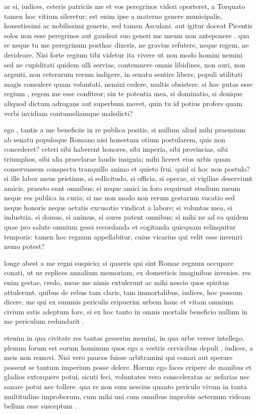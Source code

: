  ac si, iudices, ceteris patriciis me et vos peregrinos videri oporteret, a Torquato tamen hoc vitium sileretur; est enim ipse a materno genere municipalis, honestissimi ac nobilissimi generis, sed tamen Asculani. aut igitur doceat Picentis solos non esse peregrinos aut gaudeat suo generi me meum non anteponere . qua re neque tu me peregrinum posthac dixeris, ne gravius refutere, neque regem, ne derideare. Nisi forte regium tibi videtur ita vivere ut non modo homini nemini sed ne cupiditati quidem ulli servias, contemnere omnis libidines, non auri, non argenti, non ceterarum rerum indigere, in senatu sentire libere, populi utilitati magis consulere quam voluntati, nemini cedere, multis obsistere. si hoc putas esse regium , regem me esse confiteor; sin te potentia mea, si dominatio, si denique aliquod dictum adrogans aut superbum movet, quin tu id potius profers quam verbi invidiam contumeliamque maledicti?

 ego , tantis a me beneficiis in re publica positis, si nullum aliud mihi praemium ab senatu populoque Romano nisi honestum otium postularem, quis non concederet? ceteri sibi haberent honores, sibi imperia, sibi provincias, sibi triumphos, sibi alia praeclarae laudis insignia; mihi liceret eius urbis quam conservassem conspectu tranquillo animo et quieto frui. quid si hoc non postulo? si ille labor meus pristinus, si sollicitudo, si officia, si operae, si vigiliae deserviunt amicis, praesto sunt omnibus; si neque amici in foro requirunt studium meum neque res publica in curia; si me non modo non rerum gestarum vacatio sed neque honoris neque aetatis excusatio vindicat a labore; si voluntas mea, si industria, si domus, si animus, si aures patent omnibus; si mihi ne ad ea quidem quae pro salute omnium gessi recordanda et cogitanda quicquam relinquitur temporis: tamen hoc regnum appellabitur, cuius vicarius qui velit esse inveniri nemo potest?

 longe abest a me regni suspicio; si quaeris qui sint Romae regnum occupare conati, ut ne replices annalium memoriam, ex domesticis imaginibus invenies. res enim gestae, credo, meae me nimis extulerunt ac mihi nescio quos spiritus attulerunt. quibus de rebus tam claris, tam immortalibus, iudices, hoc possum dicere, me qui ex summis periculis eripuerim urbem hanc et vitam omnium civium satis adeptum fore, si ex hoc tanto in omnis mortalis beneficio nullum in me periculum redundarit .

 etenim in qua civitate res tantas gesserim memini, in qua urbe verser intellego. plenum forum est eorum hominum quos ego a vestris cervicibus depuli , iudices, a meis non removi. Nisi vero paucos fuisse arbitramini qui conari aut sperare possent se tantum imperium posse delere. Horum ego faces eripere de manibus et gladios extorquere potui, sicuti feci, voluntates vero consceleratas ac nefarias nec sanare potui nec tollere. qua re non sum nescius quanto periculo vivam in tanta multitudine improborum, cum mihi uni cum omnibus improbis aeternum videam bellum esse susceptum .

